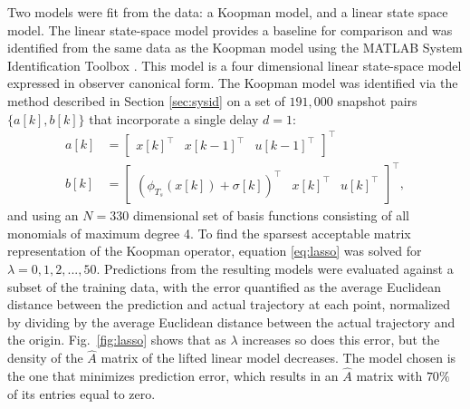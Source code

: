 Two models were fit from the data: a Koopman model, and a linear state space model.
The linear state-space model provides a baseline for comparison and was identified from the same data as the Koopman model using the MATLAB System Identification Toolbox \cite{MATLAB:2017}.
This model is a four dimensional linear state-space model expressed in observer canonical form.
The Koopman model was identified via the method described in Section \ref{sec:sysid} on a set of $191,000$ snapshot pairs $\{ a[k] , b[k] \}$ that incorporate a single delay $d = 1$:
\begin{align}
    a[k] &= \begin{bmatrix} x[k]^\top & x[k-1]^\top & u[k-1]^\top \end{bmatrix}^\top \\
    b[k] &= \begin{bmatrix} \left( \phi_{T_s} (x[k]) + \sigma[k] \right)^\top & x[k]^\top & u[k]^\top \end{bmatrix}^\top,
\end{align}
and using an $N=330$ dimensional set of basis functions consisting of all monomials of maximum degree 4.
To find the sparsest acceptable matrix representation of the Koopman operator, equation \eqref{eq:lasso} was solved for ${ \lambda = 0,1,2, ... ,50 }$.
Predictions from the resulting models were evaluated against a subset of the training data, with the error quantified as the average Euclidean distance between the prediction and actual trajectory at each point, normalized by dividing by the average Euclidean distance between the actual trajectory and the origin.
Fig.~\ref{fig:lasso} shows that as $\lambda$ increases so does this error, but the density of the $\hat{A}$ matrix of the lifted linear model decreases.
The model chosen is the one that minimizes prediction error, which results in an $\hat{A}$ matrix with $70 \%$ of its entries equal to zero.

